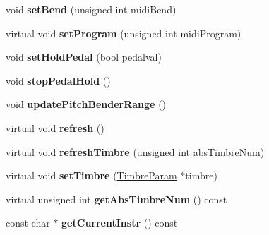 \begin{DoxyCompactItemize}
\item 
\hypertarget{classMT32Emu_1_1Part_a6cb98addec3e2fd600d7e8c6266e23ab}{void {\bfseries set\-Bend} (unsigned int midi\-Bend)}\label{classMT32Emu_1_1Part_a6cb98addec3e2fd600d7e8c6266e23ab}

\item 
\hypertarget{classMT32Emu_1_1Part_a6c83d85d1cef079d32140f4ade52db62}{virtual void {\bfseries set\-Program} (unsigned int midi\-Program)}\label{classMT32Emu_1_1Part_a6c83d85d1cef079d32140f4ade52db62}

\item 
\hypertarget{classMT32Emu_1_1Part_a4733b22a4f656c04cb0613610ad15912}{void {\bfseries set\-Hold\-Pedal} (bool pedalval)}\label{classMT32Emu_1_1Part_a4733b22a4f656c04cb0613610ad15912}

\item 
\hypertarget{classMT32Emu_1_1Part_aa94b4fcccbfc1f9effa025ea977df5f5}{void {\bfseries stop\-Pedal\-Hold} ()}\label{classMT32Emu_1_1Part_aa94b4fcccbfc1f9effa025ea977df5f5}

\item 
\hypertarget{classMT32Emu_1_1Part_a04be83433139bbe7077236c1afea5ca1}{void {\bfseries update\-Pitch\-Bender\-Range} ()}\label{classMT32Emu_1_1Part_a04be83433139bbe7077236c1afea5ca1}

\item 
\hypertarget{classMT32Emu_1_1Part_a8d67fa2ca27ba524c60e1f85ae72ca89}{virtual void {\bfseries refresh} ()}\label{classMT32Emu_1_1Part_a8d67fa2ca27ba524c60e1f85ae72ca89}

\item 
\hypertarget{classMT32Emu_1_1Part_a5e77f7cd7fa307b1aec5859eb5a008c2}{virtual void {\bfseries refresh\-Timbre} (unsigned int abs\-Timbre\-Num)}\label{classMT32Emu_1_1Part_a5e77f7cd7fa307b1aec5859eb5a008c2}

\item 
\hypertarget{classMT32Emu_1_1Part_a8455bea938f39c33e0ee782aba15c351}{virtual void {\bfseries set\-Timbre} (\hyperlink{structMT32Emu_1_1TimbreParam}{Timbre\-Param} $\ast$timbre)}\label{classMT32Emu_1_1Part_a8455bea938f39c33e0ee782aba15c351}

\item 
\hypertarget{classMT32Emu_1_1Part_aa666ae05d59af098a7062c0afe6b5568}{virtual unsigned int {\bfseries get\-Abs\-Timbre\-Num} () const }\label{classMT32Emu_1_1Part_aa666ae05d59af098a7062c0afe6b5568}

\item 
\hypertarget{classMT32Emu_1_1Part_a145fa6020b942a51c3c9e2aaa94835d6}{const char $\ast$ {\bfseries get\-Current\-Instr} () const }\label{classMT32Emu_1_1Part_a145fa6020b942a51c3c9e2aaa94835d6}


\end{DoxyCompactItemize}
